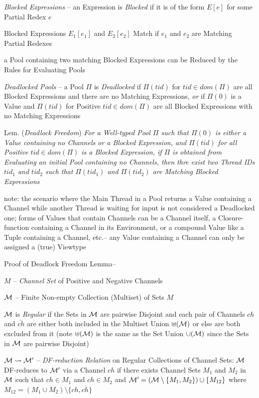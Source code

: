 \emph{Blocked Expressions} -- an Expression is \emph{Blocked} if it is
of the form $E[e]$ for some Partial Redex $e$

Blocked Expressions $E_1[e_1]$ and $E_2[e_2]$ Match if $e_1$ and $e_2$
are Matching Partial Redexes

a Pool containing two matching Blocked Expressions can be Reduced
by the Rules for Evaluating Pools

\emph{Deadlocked Pools} -- a Pool $\Pi$ is \emph{Deadlocked} if
$\Pi(tid)$ for $tid \in dom(\Pi)$ are all Blocked Expressions and
there are no Matching Expressions, \emph{or} if $\Pi(0)$ is a Value
and $\Pi(tid)$ for Positive $tid \in dom(\Pi)$ are all Blocked
Expressions with no Matching Expressions

Lem. (\emph{Deadlock Freedom}) \emph{For a Well-typed Pool $\Pi$ such
  that $\Pi(0)$ is either a Value containing no Channels or a Blocked
  Expression, and $\Pi(tid)$ for all Positive $tid \in dom(\Pi)$ is a
  Blocked Expression, if $\Pi$ is obtained from Evaluating an initial
  Pool containing no Channels, then thre exist two Thread IDs $tid_1$
  and $tid_2$ such that $\Pi(tid_1)$ and $\Pi(tid_2)$ are Matching
  Blocked Expressions}

note: the scenario where the Main Thread in a Pool returns a Value
containing a Channel while another Thread is waiting for input is not
considered a Deadlocked one; forms of Values that contain Channels can
be a Channel itself, a Closure-function containing a Channel in its
Environment, or a compound Value like a Tuple containing a Channel,
etc.-- any Value containing a Channel can only be assigned a (true)
Viewtype

Proof of Deadlock Freedom Lemma--

$M$ -- \emph{Channel Set} of Positive and Negative Channels

$\mathcal{M}$ -- Finite Non-empty Collection (Multiset) of Sets $M$

$\mathcal{M}$ is \emph{Regular} if the Sets in $\mathcal{M}$ are pairwise
Disjoint and each pair of Channels $ch$ and $\overline{ch}$ are either
both included in the Multiset Union $\uplus(\mathcal{M})$ or else are
both excluded from it (note $\uplus(\mathcal{M})$ is the same as the Set
Union $\cup(\mathcal{M})$ since the Sets in $\mathcal{M}$ are pairwise
Disjoint)

$\mathcal{M} \rightsquigarrow \mathcal{M}'$ -- \emph{DF-reduction
  Relation} on Regular Collections of Channel Sets: $\mathcal{M}$
DF-reduces to $\mathcal{M}'$ via a Channel $ch$ if there exists Channel
Sets $M_1$ and $M_2$ in $\mathcal{M}$ such that $ch \in M_1$ and $ch \in
M_2$ and $\mathcal{M}' = (\mathcal{M}\setminus\{M_1,M_2\}) \cup
\{M_{12}\}$ where $M_{12} = (M_1 \cup
M_2)\setminus\{ch,\overline{ch}\}$

